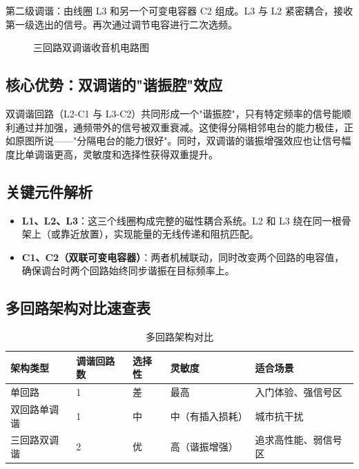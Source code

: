 \documentclass[12pt,UTF8]{ctexbook}
\begin{document}
第二级调谐：由线圈 L3 和另一个可变电容器 C2 组成。L3 与 L2 紧密耦合，接收第一级选出的信号。再次通过调节电容进行二次选频。

\begin{figure}[H]
	\centering
	\caption{三回路双调谐收音机电路图}
	\label{fig:triple-loop-circuit}
\end{figure}

\subsection{核心优势：双调谐的"谐振腔"效应}

双调谐回路（L2-C1 与 L3-C2）共同形成一个"谐振腔"，只有特定频率的信号能顺利通过并加强，通频带外的信号被双重衰减。这使得分隔相邻电台的能力极佳，正如原图所说——"分隔电台的能力很好"。同时，双调谐的谐振增强效应也让信号幅度比单调谐更高，灵敏度和选择性获得双重提升。

\subsection{关键元件解析}

\begin{itemize}[leftmargin=2cm]
	\item \textbf{L1、L2、L3}：这三个线圈构成完整的磁性耦合系统。L2 和 L3 绕在同一根骨架上（或靠近放置），实现能量的无线传递和阻抗匹配。
	\item \textbf{C1、C2（双联可变电容器）}：两者机械联动，同时改变两个回路的电容值，确保调台时两个回路始终同步谐振在目标频率上。
\end{itemize}

\subsection{多回路架构对比速查表}

\begin{table}[H]
	\centering
	\begin{tabular}{|l|l|l|l|l|}
		\hline
		架构类型 & 调谐回路数 & 选择性 & 灵敏度 & 适合场景 \\
		\hline
		单回路 & 1 & 差 & 最高 & 入门体验、强信号区 \\
		\hline
		双回路单调谐 & 1 & 中 & 中（有插入损耗） & 城市抗干扰 \\
		\hline
		三回路双调谐 & 2 & 优 & 高（谐振增强） & 追求高性能、弱信号区 \\
		\hline
	\end{tabular}
	\caption{多回路架构对比}
	\label{tab:multi-loop-comparison}
\end{table}
\end{document}
